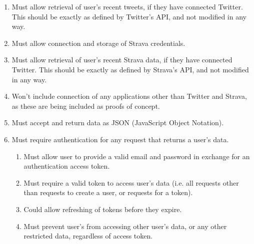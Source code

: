 \documentclass[11pt,openright,a4paper]{report}
\begin{document}
\begin{enumerate}
\item Must allow retrieval of user's recent tweets, if they have connected Twitter. This should be exactly as defined by Twitter's API, and not modified in any way.
\item Must allow connection and storage of Strava credentials.
\item Must allow retrieval of user's recent Strava data, if they have connected Twitter. This should be exactly as defined by Strava's API, and not modified in any way.
\item Won't include connection of any applications other than Twitter and Strava, as these are being included as proofs of concept.
\item Must accept and return data as JSON (JavaScript Object Notation).
\item Must require authentication for any request that returns a user's data.
  \begin{enumerate}
  \item Must allow user to provide a valid email and password in exchange for an authentication access token.
  \item Must require a valid token to access user's data (i.e. all requests other than requests to create a user, or requests for a token).
  \item Could allow refreshing of tokens before they expire.
  \item Must prevent user's from accessing other user's data, or any other restricted data, regardless of access token.
  \end{enumerate}
\end{enumerate}
\end{document}
